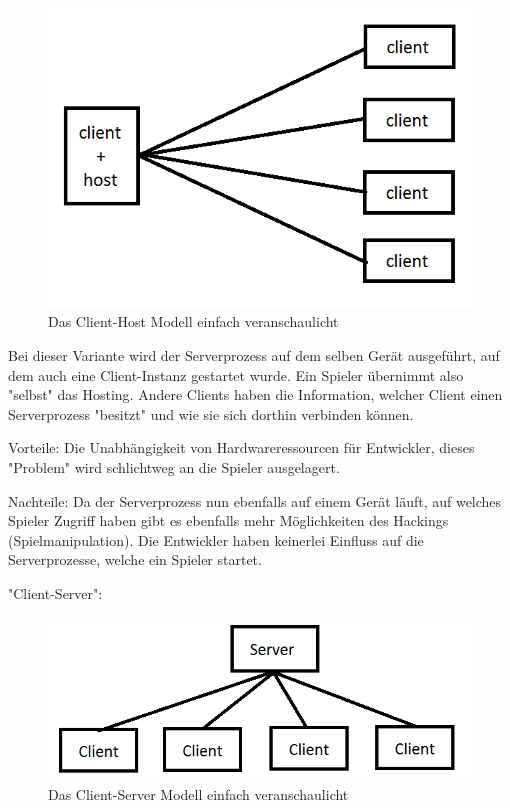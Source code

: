 \begin{figure}
	\centering
	\includegraphics{images/Client_Host.png}
	\caption[Client-Server Modell]{Das Client-Host Modell einfach veranschaulicht}
	\label{pic:Client_Host}
\end{figure}




Bei dieser Variante wird der Serverprozess auf dem selben Gerät ausgeführt, auf dem auch eine Client-Instanz gestartet wurde. Ein Spieler übernimmt also "selbst" das Hosting. Andere Clients haben die Information, welcher Client einen Serverprozess "besitzt" und wie sie sich dorthin verbinden können. 

Vorteile: Die Unabhängigkeit von Hardwareressourcen für Entwickler, dieses "Problem" wird schlichtweg an die Spieler ausgelagert. 

Nachteile: Da der Serverprozess nun ebenfalls auf einem Gerät läuft, auf welches Spieler Zugriff haben gibt es ebenfalls mehr Möglichkeiten des Hackings (Spielmanipulation). Die Entwickler haben keinerlei Einfluss auf die Serverprozesse, welche ein Spieler startet.
\cite{Smed.2002}

"Client-Server":

\begin{figure}
\centering
\includegraphics{images/Client_Server.png}
\caption[Client-Server Modell]{Das Client-Server Modell einfach veranschaulicht}
\label{pic:Client_Server}
\end{figure}



